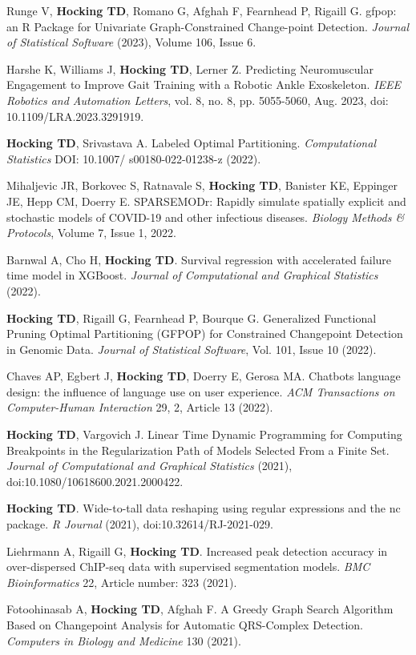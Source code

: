 \documentclass[margin,line]{res}
\begin{document}
\begin{resume}
Runge V, {\bf Hocking TD}, Romano G, Afghah F, Fearnhead P, Rigaill
G. gfpop: an R Package for Univariate Graph-Constrained Change-point
Detection. {\it Journal of Statistical Software} (2023), Volume 106,
Issue 6.

Harshe K, Williams J, {\bf Hocking TD}, Lerner Z. Predicting Neuromuscular
Engagement to Improve Gait Training with a Robotic Ankle
Exoskeleton. {\it IEEE Robotics and Automation Letters}, vol. 8,
no. 8, pp. 5055-5060, Aug. 2023, doi: 10.1109/LRA.2023.3291919.

{\bf Hocking TD}, Srivastava A. Labeled Optimal Partitioning. {\it
  Computational Statistics} DOI: 10.1007/ s00180-022-01238-z (2022).

Mihaljevic JR, Borkovec S, Ratnavale S, \textbf{Hocking TD}, Banister
KE, Eppinger JE, Hepp CM, Doerry E. SPARSEMODr: Rapidly simulate
spatially explicit and stochastic models of COVID-19 and other
infectious diseases. {\it Biology Methods \& Protocols}, Volume 7,
Issue 1, 2022.

Barnwal A, Cho H, {\bf Hocking TD}. Survival regression with
accelerated failure time model in XGBoost. {\it Journal of
  Computational and Graphical Statistics} (2022).

{\bf Hocking TD}, Rigaill G, Fearnhead P, Bourque G. Generalized
Functional Pruning Optimal Partitioning (GFPOP) for Constrained
Changepoint Detection in Genomic Data. {\it Journal of Statistical
  Software}, Vol. 101, Issue 10 (2022).

Chaves AP, Egbert J, {\bf Hocking TD}, Doerry E, Gerosa MA. Chatbots
language design: the influence of language use on user
experience. {\it ACM Transactions on Computer-Human Interaction} 29,
2, Article 13 (2022).

{\bf Hocking TD}, Vargovich J. Linear Time Dynamic Programming for
Computing Breakpoints in the Regularization Path of Models Selected
From a Finite Set. {\it Journal of Computational and Graphical
  Statistics} (2021), doi:10.1080/10618600.2021.2000422.

{\bf Hocking TD}. Wide-to-tall data reshaping using regular
expressions and the nc package. {\it R Journal} (2021),
doi:10.32614/RJ-2021-029.

Liehrmann A, Rigaill G, {\bf Hocking TD}. Increased peak detection
accuracy in over-dispersed ChIP-seq data with supervised segmentation
models. {\it BMC Bioinformatics} 22, Article number: 323 (2021).

Fotoohinasab A, {\bf Hocking TD}, Afghah F. A Greedy Graph Search
Algorithm Based on Changepoint Analysis for Automatic QRS-Complex
Detection. {\it Computers in Biology and Medicine} 130 (2021).


\end{resume}
\end{document}
